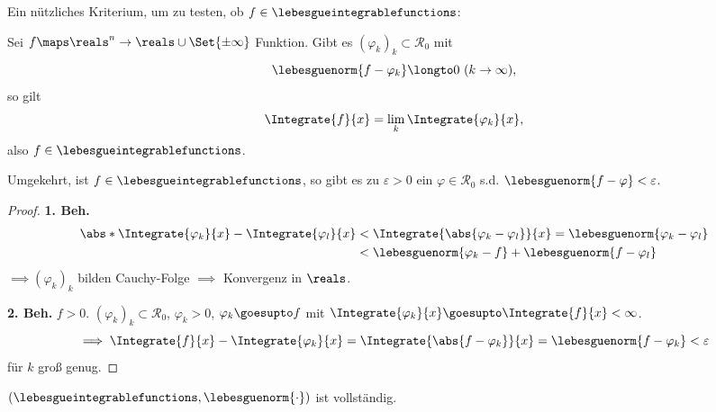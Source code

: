 Ein nützliches Kriterium, um zu testen, ob \(f\in \lebesgueintegrablefunctions\):

\begin{lemma}
    \label{kriterium_L1}
    Sei \(f\maps\reals^n\to\reals\cup\Set{\pm\infty}\) Funktion. Gibt es \((\varphi_k)_k\subset\mathcal{R_0}\) mit 
    \begin{equation*}
        \lebesguenorm{f-\varphi_k}\longto 0\ (k\to\infty),
    \end{equation*}
    so gilt 
    \begin{equation*}
        \Integrate{ f}{x}=\lim_k\Integrate{ \varphi_k}{x},
    \end{equation*}
    also \(f\in \lebesgueintegrablefunctions\).

    Umgekehrt, ist \(f\in \lebesgueintegrablefunctions\), so gibt es zu \(\varepsilon>0\) ein \(\varphi\in\mathcal{R_0}\) s.d. \(\lebesguenorm{f-\varphi}<\varepsilon\).
\end{lemma}

\begin{proof}
    \textbf{1. Beh.} 
    \begin{align*}
        \abs*{\Integrate{\varphi_k}{x}-\Integrate{\varphi_l}{x}} &<\Integrate{\abs{\varphi_k-\varphi_l}}{x} = \lebesguenorm{\varphi_k-\varphi_l}\\
        &<\lebesguenorm{\varphi_k-f}+\lebesguenorm{f-\varphi_l}
    \end{align*}
    \(\implies(\varphi_k)_k\) bilden Cauchy-Folge \(\implies\) Konvergenz in \( \reals \).

    \textbf{2. Beh.} \Obda \(f> 0\).
    \texists \((\varphi_k)_k\subset\mathcal{R}_0\), \( \varphi_k> 0\), \( \varphi_k\goesupto f\) mit \(\Integrate{\varphi_k}{x}\goesupto\Integrate{f}{x}<\infty\).
    \begin{equation*}
        \implies \Integrate{ f}{x}-\Integrate{\varphi_k}{x}=\Integrate{\abs{f-\varphi_k}}{x}=\lebesguenorm{f-\varphi_k}< \varepsilon
    \end{equation*}
    für \(k\) groß genug.
\end{proof}

\begin{satz}
    \label{theoL1complete} %
    \((\lebesgueintegrablefunctions,\lebesguenorm{\cdot})\) ist vollständig.
\end{satz}

